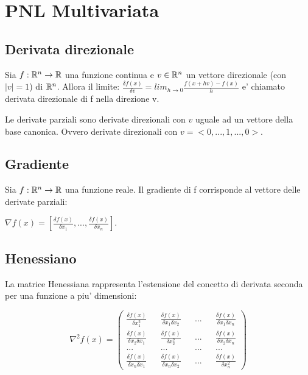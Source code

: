 \chapter{PNL Multivariata}

\section{Derivata direzionale}

Sia $f : \mathbb{R}^n \rightarrow \mathbb{R}$ una funzione continua e $v \in \mathbb{R}^n$ un vettore direzionale (con $|v| = 1$) di $\mathbb{R}^n$.
Allora il limite: $\frac {\delta f(x)} {\delta v} = lim _ {h \rightarrow 0} \frac {f(x + hv) - f(x)} {h}$ e' chiamato derivata direzionale di f nella direzione v.

Le derivate parziali sono derivate direzionali con $v$ uguale ad un vettore della base canonica. Ovvero derivate direzionali con $v = <0,...,1,...,0>$.

\section{Gradiente}

Sia $f : \mathbb{R}^n \rightarrow \mathbb{R}$ una funzione reale. Il gradiente di f corrisponde al vettore delle derivate parziali:

$\nabla f(x) = [ \frac {\delta f(x)} {\delta x_1}, ..., \frac {\delta f(x)} {\delta x_n} ]$.

\section{Henessiano}

La matrice Henessiana rappresenta l'estensione del concetto di derivata seconda per una funzione a piu' dimensioni:

\[
    \nabla^2 f(x) =
    \begin{pmatrix}
        \frac {\delta f(x)} {\delta x_1^2} && \frac {\delta f(x)} {\delta x_1 \delta x_2} && ... && \frac {\delta f(x)} {\delta x_1 \delta x_n} \\
        \frac {\delta f(x)} {\delta x_2 \delta x_1} && \frac {\delta f(x)} {\delta x_2^2} && ... && \frac {\delta f(x)} {\delta x_2 \delta x_n} \\
        ... && ... && ... && ... \\
        \frac {\delta f(x)} {\delta x_n \delta x_1} && \frac {\delta f(x)} {\delta x_n \delta x_2} && ... && \frac {\delta f(x)} {\delta x_n^2}
    \end{pmatrix}
\]

